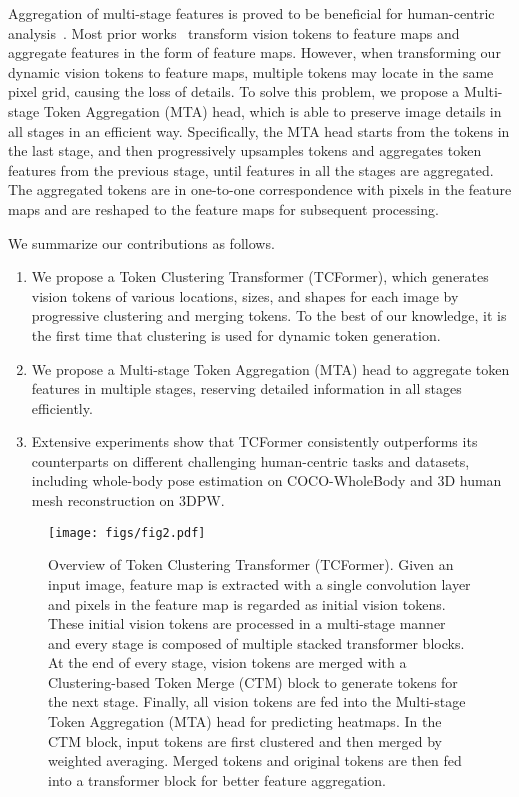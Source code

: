 \documentclass[10pt,twocolumn,letterpaper]{article}
\begin{document}
Aggregation of multi-stage features is proved to be beneficial for human-centric analysis~\cite{sun2019deep,yuan2021hrformer}. Most prior works~\cite{pvt,yuan2021hrformer,swin} transform vision tokens to feature maps and aggregate features in the form of feature maps. However, when transforming our dynamic vision tokens to feature maps, multiple tokens may locate in the same pixel grid, causing the loss of details.
To solve this problem, we propose a Multi-stage Token Aggregation (MTA) head, which is able to preserve image details in all stages in an efficient way. 
Specifically, the MTA head starts from the tokens in the last stage, and then progressively upsamples tokens and aggregates token features from the previous stage, until features in all the stages are aggregated.
The aggregated tokens are in one-to-one correspondence with pixels in the feature maps and are reshaped to the feature maps for subsequent processing.



We summarize our contributions as follows.
 \begin{enumerate}
	\item[] 
	We propose a Token Clustering Transformer (TCFormer), which generates vision tokens of various locations, sizes, and shapes for each image by progressive clustering and merging tokens. To the best of our knowledge, it is the first time that clustering is used for dynamic token generation.

	\item[] We propose a Multi-stage Token Aggregation (MTA) head to aggregate token features in multiple stages, reserving detailed information in all stages efficiently.
	
	\item[] Extensive experiments show that TCFormer consistently outperforms its counterparts on different challenging human-centric tasks and datasets, including whole-body pose estimation on COCO-WholeBody and 3D human mesh reconstruction on 3DPW.
\end{enumerate}

\vspace{+5pt} 

\begin{figure*}[t]
	\centering
	\texttt{[image: figs/fig2.pdf]}
	\vspace{-12pt}
	\caption{
	Overview of Token Clustering Transformer (TCFormer). 
	Given an input image, feature map is extracted with a single convolution layer and pixels in the feature map is regarded as initial vision tokens. These initial vision tokens are processed in a multi-stage manner and every stage is composed of multiple stacked transformer blocks.
    At the end of every stage, vision tokens are merged with a Clustering-based Token Merge (CTM) block to generate tokens for the next stage. 
    Finally, all vision tokens are fed into the Multi-stage Token Aggregation (MTA) head for predicting heatmaps.
	In the CTM block, input tokens are first clustered and then merged by weighted averaging.
	Merged tokens and original tokens are then fed into a transformer block for better feature aggregation. 
	}
	\label{fig:framework}
	\vspace{-5pt}
\end{figure*}
\end{document}
